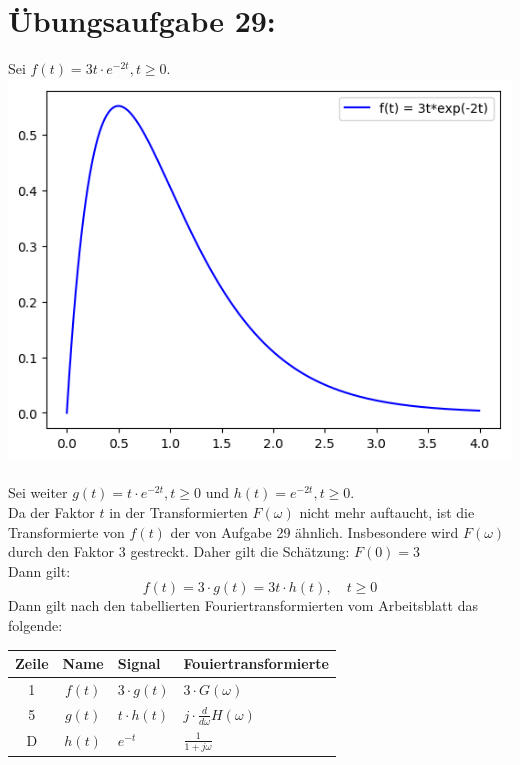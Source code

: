 

	\section*{Übungsaufgabe 29:}
		Sei $f(t) = 3t\cdot e^{-2t}, t\ge 0$.\\
		\includegraphics[scale = 0.7]{A29_graphPlot.png}\\
		\\
		Sei weiter $g(t) = t\cdot e^{-2t}, t\ge 0$ und $h(t)=e^{-2t}, t\ge 0$.\\
		Da der Faktor $t$ in der Transformierten $F(\omega)$ nicht mehr auftaucht, ist die Transformierte von $f(t)$ der von Aufgabe 29 ähnlich. Insbesondere wird $F(\omega)$ durch den Faktor 3 gestreckt. Daher gilt die Schätzung: $F(0) = 3$\\
		Dann gilt:
		$$ f(t) = 3\cdot g(t) = 3t \cdot h(t),\quad t\ge 0$$
		Dann gilt nach den tabellierten Fouriertransformierten vom Arbeitsblatt das folgende:\\
		\begin{tabular}{c | c | l | l}
			Zeile	&	 Name	&	Signal			&	Fouiertransformierte\\
			\hline
			1		&	$f(t)$	&	$3 \cdot g(t)$	&	$3\cdot G(\omega)$\\
			5		&	$g(t)$	&	$t \cdot h(t)$	&	$j\cdot \frac{d}{d\omega}H(\omega)$\\
			D		&	$h(t)$	&	$e^{-t}$		&	$\frac{1}{1+j\omega}$
		\end{tabular}\\
